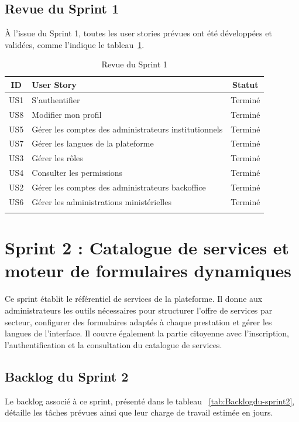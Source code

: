 \subsection{Revue du Sprint 1}
À l’issue du Sprint 1, toutes les user stories prévues ont été développées et validées, comme l’indique le tableau~\ref{tab:revue-sprint1}.

\begin{longtable}{|c|p{9cm}|c|}
\hline
\rowcolor{orange!30}
\textbf{ID} & \textbf{User Story} & \textbf{Statut} \\ \hline
US1 & S'authentifier & \textcolor{green!60!black}{Terminé} \\ \hline
US8 & Modifier mon profil & \textcolor{green!60!black}{Terminé} \\ \hline
US5 & Gérer les comptes des administrateurs institutionnels & \textcolor{green!60!black}{Terminé} \\ \hline
US7 & Gérer les langues de la plateforme & \textcolor{green!60!black}{Terminé} \\ \hline
US3 & Gérer les rôles & \textcolor{green!60!black}{Terminé} \\ \hline
US4 & Consulter les permissions & \textcolor{green!60!black}{Terminé} \\ \hline
US2 & Gérer les comptes des administrateurs backoffice & \textcolor{green!60!black}{Terminé} \\ \hline
US6 & Gérer les administrations ministérielles & \textcolor{green!60!black}{Terminé} \\ \hline
\caption{Revue du Sprint 1}
\label{tab:revue-sprint1}
\end{longtable}



\section{Sprint 2 : Catalogue de services et moteur de formulaires dynamiques}

Ce sprint établit le référentiel de services de la plateforme. Il donne aux administrateurs les outils nécessaires pour structurer l'offre de services par secteur, configurer des formulaires adaptés à chaque prestation et gérer les langues de l'interface. Il couvre également la partie citoyenne avec l'inscription, l'authentification et la consultation du catalogue de services.

\subsection{Backlog du Sprint 2}
Le backlog associé à ce sprint, présenté dans le tableau ~\ref{tab:Backlogdu-sprint2}, détaille les tâches prévues ainsi que leur charge de travail estimée en jours. 


